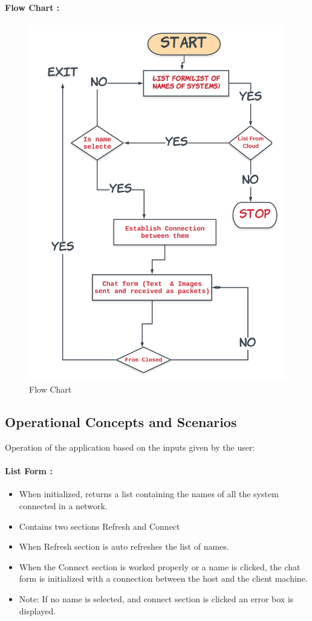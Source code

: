 \paragraph{Flow Chart :}

\noindent
\begin{figure}[!ht]
	\centering
	\includegraphics[scale=0.4]{flow-chart.png}
	\caption{\label{img1} Flow Chart}
\end{figure}
\vspace{70ex}
\subsection{ Operational Concepts and Scenarios}
Operation of the application based on the inputs given by the user:
\paragraph{List Form :}
\begin{itemize}
	\item When initialized, returns a list containing the names of all the system connected in a network.
	\item Contains two sections Refresh and Connect
	\item When Refresh section is auto refreshes the list of names.
	\item When the Connect section is worked properly or a name is clicked, the chat form is
	initialized with a connection between the host and the client machine.
	\item Note: If no name is selected, and connect section is clicked an error box is displayed.
\end{itemize}
